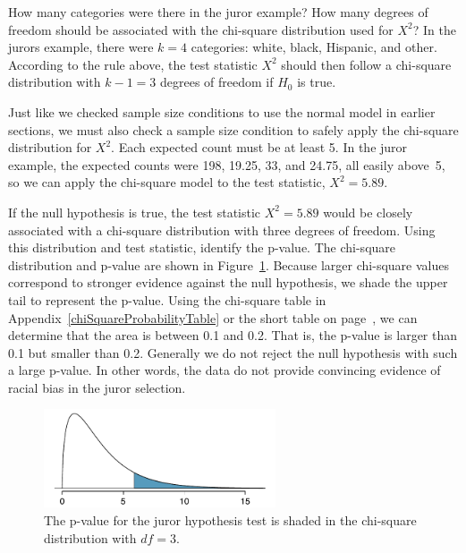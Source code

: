 \begin{example}{How many categories were there in the juror example? How many degrees of freedom should be associated with the chi-square distribution used for $X^2$?}
In the jurors example, there were $k=4$ categories: white, black, Hispanic, and other. According to the rule above, the test statistic $X^2$ should then follow a chi-square distribution with $k-1 = 3$ degrees of freedom if $H_0$ is true.
\end{example}

Just like we checked sample size conditions to use the normal model in earlier sections, we must also check a sample size condition to safely apply the chi-square distribution for $X^2$. Each expected count must be at least 5. In the juror example, the expected counts were 198, 19.25, 33, and 24.75, all easily above~5, so we can apply the chi-square model to the test statistic, $X^2=5.89$.

\begin{example}{If the null hypothesis is true, the test statistic $X^2=5.89$ would be closely associated with a chi-square distribution with three degrees of freedom. Using this distribution and test statistic, identify the p-value.}
The chi-square distribution and p-value are shown in Figure~\ref{jurorHTPValueShown}. Because larger chi-square values correspond to stronger evidence against the null hypothesis, we shade the upper tail to represent the p-value. Using the chi-square table in Appendix~\ref{chiSquareProbabilityTable} or the short table on page~\pageref{chiSquareProbabilityTableShort}, we can determine that the area is between 0.1 and 0.2. That is, the p-value is larger than 0.1 but smaller than 0.2. Generally we do not reject the null hypothesis with such a large p-value. In other words, the data do not provide convincing evidence of racial bias in the juror selection.
\end{example}

\begin{figure}[h]
\centering
\includegraphics[width=0.61\textwidth]{ch_inference_for_props/figures/jurorHTPValueShown/jurorHTPValueShown}
\caption{The p-value for the juror hypothesis test is shaded in the chi-square distribution with $df=3$.}
\label{jurorHTPValueShown}
\end{figure}

